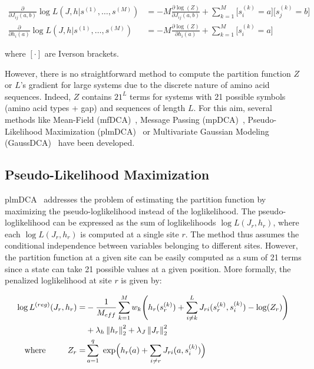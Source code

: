         \begin{equation}
            \begin{split}
                \frac{\partial}{\partial J_{ij}(a, b)} \log{L}(J, h \vert s^{(1)}, \dotsc, s^{(M)}) & =
                    -M \frac{\partial \log(Z)}{\partial J_{ij}(a, b)} + \sum\limits_{k=1}^M \Big[s_i^{(k)} = a\Big] \Big[s_j^{(k)} = b\Big] \\
                 \frac{\partial}{\partial h_{i}(a)} \log{L}(J, h \vert s^{(1)}, \dotsc, s^{(M)}) & =
                    -M \frac{\partial \log(Z)}{\partial h_{i}(a)} + \sum\limits_{k=1}^M \Big[s_i^{(k)} = a\Big]
            \end{split}
        \end{equation}

        where $[ \cdot ]$ are Iverson brackets.

        However, there is no straightforward method to compute the partition function $Z$ or $L$'s gradient for large
        systems due to the discrete nature of amino acid sequences.
        Indeed, $Z$ contains $21^L$ terms for systems with 21 possible symbols (amino acid types + gap)
        and sequences of length $L$.
        For this aim, several methods like Mean-Field (mfDCA)~\cite{MorcosE1293}, Message Passing (mpDCA)~\cite{Weigt2009},
        Pseudo-Likelihood Maximization (plmDCA)~\cite{EKEBERG2014341}
        or Multivariate Gaussian Modeling (GaussDCA)~\cite{10.1371/journal.pone.0092721}
        have been developed.

    \subsection{Pseudo-Likelihood Maximization}

        plmDCA~\cite{EKEBERG2014341} addresses the problem of estimating
        the partition function by maximizing the pseudo-loglikelihood instead of the loglikelihood.
        The pseudo-loglikelihood can be expressed as the sum of loglikelihoods $\log{L}(J_r, h_r)$,
        where each $\log{L}(J_r, h_r)$ is computed
        at a single site $r$. The method thus assumes the conditional
        independence between variables belonging to different sites.
        However, the partition function at a given site can be easily computed as a sum of
        21 terms since a state can take 21 possible values at a given position.
        More formally, the penalized loglikelihood at site $r$ is given by:

        \begin{equation}
            \begin{split}
                \log{L^{(reg)}}(J_r, h_r) = & -\frac{1}{M_{eff}} \sum\limits_{k=1}^M w_k \Bigg( h_r(s_r^{(k)})
                    + \sum\limits_{i \neq k}^L J_{ri}(s_r^{(k)}, s_i^{(k)}) - \log(Z_r) \Bigg) \\
                & + \lambda_h \left\lVert h_r\right\rVert_2^2 + \lambda_J \left\lVert J_r\right\rVert_2^2 \\
                \text{where} \ \ \ \ \ \ \ \ Z_r = & \sum\limits_{a=1}^q \text{ exp}\Big(h_r(a) + \sum\limits_{i \neq r} J_{ri}(a, s_i^{(k)})\Big)
            \end{split}
        \end{equation}

